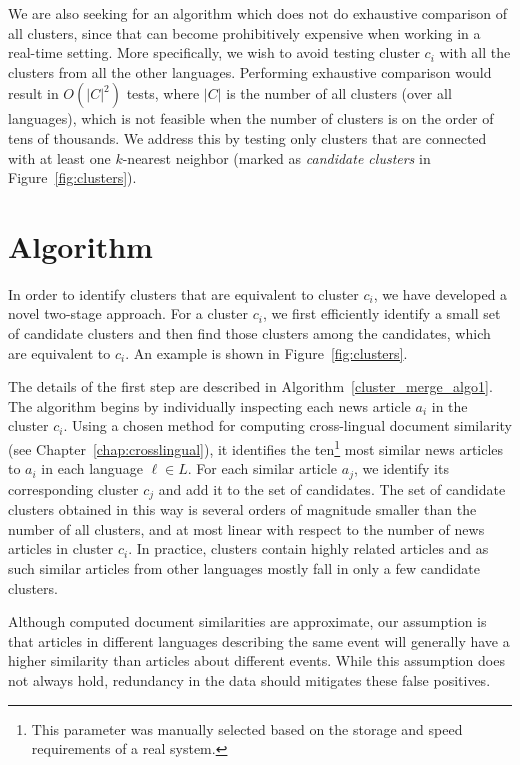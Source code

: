 We are also seeking for an algorithm which does not do exhaustive comparison of all clusters,
since that can become prohibitively expensive when working in a real-time setting. More specifically,
we wish to avoid testing cluster $c_i$ with all the clusters from all the other languages.
Performing exhaustive comparison would result in $O(|C|^2)$ tests, where $|C|$ is the number of all
clusters (over all languages), which is not feasible when the number of clusters is on the order of tens
of thousands. We address this by testing only clusters that are connected with at least one $k$-nearest
neighbor (marked as \emph{candidate clusters} in Figure~\ref{fig:clusters}).

\section{Algorithm}\label{algo:features}

In order to identify clusters that are equivalent to cluster $c_i$, we have developed 
a novel two-stage approach. For a cluster $c_i$, we first efficiently identify a small set of
candidate clusters and then find those clusters among the candidates, which are
equivalent to $c_i$. An example is  shown in  Figure~\ref{fig:clusters}.

The details of the first step are described in Algorithm~\ref{cluster_merge_algo1}. The algorithm
begins by individually inspecting each news article $a_i$ in the cluster $c_i$. Using a chosen
method for computing cross-lingual document similarity (see Chapter~\ref{chap:crosslingual}), it identifies
the ten\footnote{This parameter was manually selected based on the storage and speed requirements of a real system.} 
most similar news articles to $a_i$ in each language $\ell \in L$. For each similar
article $a_j$, we identify its corresponding  cluster $c_j$ and add it to the set of candidates.
The set of candidate clusters obtained in this way is several orders of magnitude smaller than the
number of all clusters, and at most linear with respect to the number of news articles in
cluster $c_i$. In practice, clusters contain highly related articles and as such similar
articles from other languages mostly fall in only a few candidate clusters.

Although computed document similarities are approximate, our  assumption is that articles
in different languages describing the same event will generally have a higher similarity
than articles about different events. While this assumption does not always hold, redundancy
in the data should mitigates these false positives.

